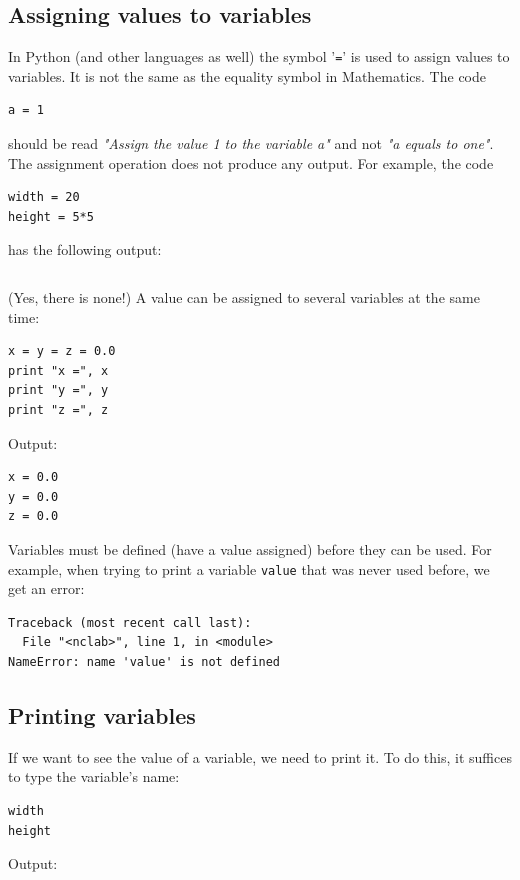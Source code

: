 \documentclass[article,A4,12pt]{llncs}
\begin{document}
\subsection{Assigning values to variables}

In Python (and other languages as well) the symbol '{\tt =}' is used to assign 
values to variables. It is not the same as the equality symbol in Mathematics. 
The code

\begin{verbatim}
a = 1
\end{verbatim}
should be read {\em "Assign the value 1 to the variable a"} and not {\em "a equals to one"}.
The assignment operation does not produce any output. For example, the code

\begin{verbatim}
width = 20
height = 5*5
\end{verbatim}
has the following output:

\begin{verbatim}

\end{verbatim}
(Yes, there is none!) A value can be assigned to several variables at the same time:

\begin{verbatim}
x = y = z = 0.0
print "x =", x
print "y =", y
print "z =", z
\end{verbatim}
Output:

\begin{verbatim}
x = 0.0
y = 0.0
z = 0.0
\end{verbatim}
Variables must be defined (have a value assigned) before they can be 
used. For example, when trying to print a variable {\tt value} that 
was never used before, we get an error:

\begin{verbatim}
Traceback (most recent call last):
  File "<nclab>", line 1, in <module>
NameError: name 'value' is not defined
\end{verbatim}

\subsection{Printing variables}

If we want to see the value of a variable, we need to print it.
To do this, it suffices to type the variable's name:

\begin{verbatim}
width
height
\end{verbatim}
Output:
\end{document}
